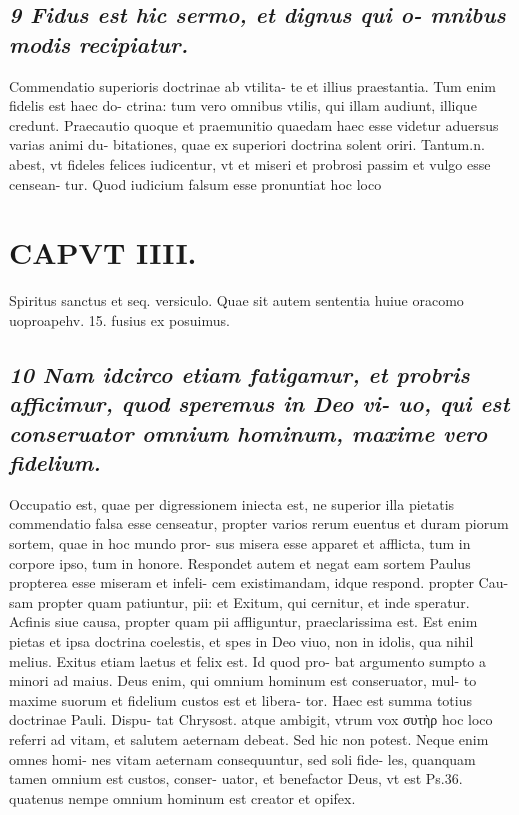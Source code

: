 \documentclass{article}
\begin{document}
\begin{pages}
\subsection*{\textit{9 Fidus est hic sermo, et dignus qui o- mnibus modis recipiatur. }}\pstart Commendatio superioris doctrinae ab vtilita- te et illius praestantia. Tum enim fidelis est haec do- ctrina: tum vero omnibus vtilis, qui illam audiunt, illique  credunt. Praecautio quoque  et praemunitio quaedam haec esse videtur aduersus varias animi du- bitationes, quae ex superiori doctrina solent oriri. Tantum.n. abest, vt fideles felices iudicentur, vt et miseri et probrosi passim et vulgo esse censean- tur. Quod iudicium falsum esse pronuntiat hoc loco  \pend
\section*{CAPVT  IIII. }
\marginpar{[ p.223 ]}\pstart Spiritus sanctus et seq. versiculo. Quae sit autem sententia huiue oracomo uoproapehv. 15. fusius ex posuimus.  \pend
{}
{}
\subsection*{\textit{10 Nam idcirco etiam fatigamur, et probris afficimur, quod speremus in Deo vi- uo, qui est conseruator omnium hominum, maxime vero fidelium. }}\pstart Occupatio est, quae per digressionem iniecta est, ne superior illa pietatis commendatio falsa esse censeatur, propter varios rerum euentus et duram piorum sortem, quae in hoc mundo pror- sus misera esse apparet et afflicta, tum in corpore ipso, tum in honore. Respondet autem et negat eam sortem Paulus propterea esse miseram et infeli- cem existimandam, idque respond. propter Cau- sam propter quam patiuntur, pii: et Exitum, qui cernitur, et inde speratur. Acfinis siue causa, propter quam pii affliguntur, praeclarissima est. Est enim pietas et ipsa doctrina coelestis, et spes in Deo viuo, non in idolis, qua nihil melius.  \pend\pstart Exitus etiam laetus et felix est. Id quod pro- bat argumento sumpto a minori ad maius. Deus enim, qui omnium hominum est conseruator, mul- to maxime suorum et fidelium custos est et libera- tor. Haec est summa totius doctrinae Pauli. Dispu- tat Chrysost. atque ambigit, vtrum vox συτὴρ hoc loco referri ad vitam, et salutem aeternam debeat. Sed hic non potest. Neque enim omnes homi- nes vitam aeternam consequuntur, sed soli fide- les, quanquam tamen omnium est custos, conser- uator, et benefactor Deus, vt est Ps.36. quatenus nempe omnium hominum est creator et opifex.  \pend

\end{pages}
\end{document}
